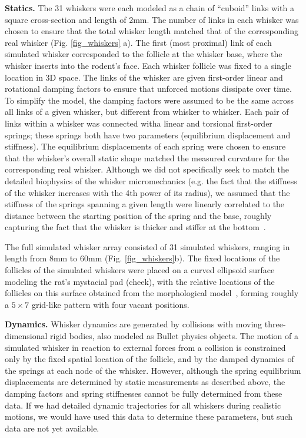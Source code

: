 \textbf{Statics.} The 31 whiskers were each modeled as a chain of ``cuboid'' links with a square cross-section and length of 2mm.   
The number of links in each whisker was chosen to ensure that the total whisker length matched that of the corresponding real whisker (Fig. \ref{fig_whiskers} a).
The first (most proximal) link of each simulated whisker corresponded to the follicle at the whisker base, where the whisker inserts into the rodent's face. 
Each whisker follicle was fixed to a single location in 3D space.  
The links of the whisker are given first-order linear and rotational damping factors to ensure that unforced motions dissipate over time. 
To simplify the model, the damping factors were assumed to be the same across all links of a given whisker, but different from whisker to whisker.   
Each pair of links within a whisker was connected witha  linear and torsional first-order springs; these springs both have two parameters (equilibrium displacement and stiffness). 
The equilibrium displacements of each spring were chosen to ensure that the whisker's overall static shape matched the measured curvature for the corresponding real whisker.  
Although we did not specifically seek to match the detailed biophysics of the whisker micromechanics (e.g. the fact that the stiffness of the whisker increases with the 4th power of its radius),   
we assumed that the stiffness of the springs spanning a given length were linearly correlated to the distance between the starting position of the spring and the base, roughly capturing the fact that the whisker is thicker and stiffer at the bottom~\cite{Hartmann:2015}.

The full simulated whisker array consisted of 31 simulated whiskers, ranging in length from 8mm to 60mm (Fig. \ref{fig_whiskers}b). 
The fixed locations of the follicles of the simulated whiskers were placed on a curved ellipsoid surface modeling the rat's mystacial pad (cheek), with the relative locations of the follicles on this surface obtained from the morphological model~\cite{Towal2011}, forming roughly a $5\times7$ grid-like pattern with four vacant positions.

\textbf{Dynamics.} Whisker dynamics are generated by collisions with moving three-dimensional rigid bodies, also modeled as Bullet physics objects.  
The motion of a simulated whisker in reaction to external forces from a collision is constrained only by the fixed spatial location of the follicle, and by the damped dynamics of the springs at each node of the whisker. 
However, although the spring equilibrium displacements are determined by static measurements as described above, the damping factors and spring stiffnesses cannot be fully determined from these data.  
If we had detailed dynamic trajectories for all whiskers during realistic motions\cite{}, we would have used this data to determine these parameters, but such data are not yet available.  

